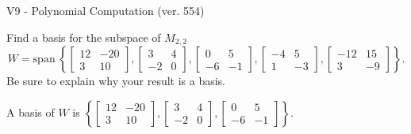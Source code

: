 \begin{exercise}
  \begin{exerciseTitle}V9 - Polynomial Computation (ver. 554)\end{exerciseTitle}
  \begin{exerciseStatement}
    Find a basis for the subspace of \(M_{2,2}\) 
\[W=\mathrm{span}\ \left\{\left[\begin{array}{cc}
12 & -20 \\
3 & 10
\end{array}\right] , \left[\begin{array}{cc}
3 & 4 \\
-2 & 0
\end{array}\right] , \left[\begin{array}{cc}
0 & 5 \\
-6 & -1
\end{array}\right] , \left[\begin{array}{cc}
-4 & 5 \\
1 & -3
\end{array}\right] , \left[\begin{array}{cc}
-12 & 15 \\
3 & -9
\end{array}\right]\right\}.\]
 Be sure to explain why your result is a basis.


  \end{exerciseStatement}
  \begin{exerciseAnswer}
   A basis of \(W\) is  \(\left\{\left[\begin{array}{cc}
12 & -20 \\
3 & 10
\end{array}\right] , \left[\begin{array}{cc}
3 & 4 \\
-2 & 0
\end{array}\right] , \left[\begin{array}{cc}
0 & 5 \\
-6 & -1
\end{array}\right]\right\}\).
  


  \end{exerciseAnswer}
\end{exercise}